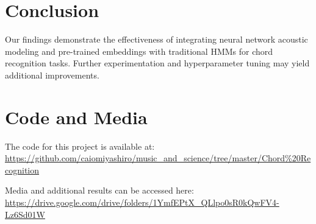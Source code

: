\documentclass{article}
\begin{document}
\section{Conclusion}
Our findings demonstrate the effectiveness of integrating neural network acoustic modeling and pre-trained embeddings with traditional HMMs for chord recognition tasks. Further experimentation and hyperparameter tuning may yield additional improvements.

\section*{Code and Media}
The code for this project is available at: \url{https://github.com/caiomiyashiro/music_and_science/tree/master/Chord\%20Recognition}

Media and additional results can be accessed here: \url{https://drive.google.com/drive/folders/1YmfEPtX_QLlpo0sR0kQwFV4-Lz6Sd01W}



\end{document}
